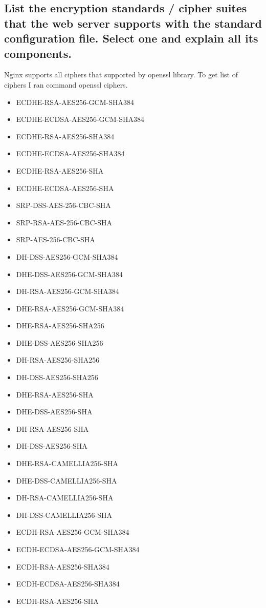 \documentclass[a4paper,11pt]{article}
\begin{document}
\subsection{List the encryption standards / cipher suites that the web server supports with the standard configuration file. Select one and explain all its components.}
Nginx supports all ciphers that supported by openssl library. To get list of ciphers I ran command openssl ciphers.

\begin{itemize}
\item ECDHE-RSA-AES256-GCM-SHA384
\item ECDHE-ECDSA-AES256-GCM-SHA384
\item ECDHE-RSA-AES256-SHA384
\item ECDHE-ECDSA-AES256-SHA384
\item ECDHE-RSA-AES256-SHA
\item ECDHE-ECDSA-AES256-SHA
\item SRP-DSS-AES-256-CBC-SHA
\item SRP-RSA-AES-256-CBC-SHA
\item SRP-AES-256-CBC-SHA
\item DH-DSS-AES256-GCM-SHA384
\item DHE-DSS-AES256-GCM-SHA384
\item DH-RSA-AES256-GCM-SHA384
\item DHE-RSA-AES256-GCM-SHA384
\item DHE-RSA-AES256-SHA256
\item DHE-DSS-AES256-SHA256
\item DH-RSA-AES256-SHA256
\item DH-DSS-AES256-SHA256
\item DHE-RSA-AES256-SHA
\item DHE-DSS-AES256-SHA
\item DH-RSA-AES256-SHA
\item DH-DSS-AES256-SHA
\item DHE-RSA-CAMELLIA256-SHA
\item DHE-DSS-CAMELLIA256-SHA
\item DH-RSA-CAMELLIA256-SHA
\item DH-DSS-CAMELLIA256-SHA
\item ECDH-RSA-AES256-GCM-SHA384
\item ECDH-ECDSA-AES256-GCM-SHA384
\item ECDH-RSA-AES256-SHA384
\item ECDH-ECDSA-AES256-SHA384
\item ECDH-RSA-AES256-SHA

\end{itemize}
\end{document}
